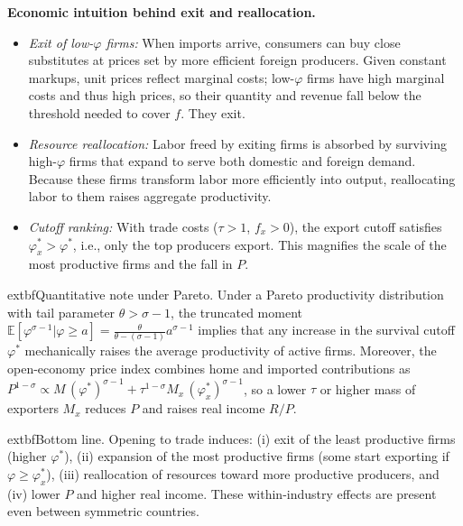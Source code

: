 \begin{solution}
\bigskip
	\textbf{Economic intuition behind exit and reallocation.}
\begin{itemize}
	\item \emph{Exit of low-$\varphi$ firms:} When imports arrive, consumers can buy close substitutes at prices set by more efficient foreign producers. Given constant markups, unit prices reflect marginal costs; low-$\varphi$ firms have high marginal costs and thus high prices, so their quantity and revenue fall below the threshold needed to cover $f$. They exit.
	\item \emph{Resource reallocation:} Labor freed by exiting firms is absorbed by surviving high-$\varphi$ firms that expand to serve both domestic and foreign demand. Because these firms transform labor more efficiently into output, reallocating labor to them raises aggregate productivity.
	\item \emph{Cutoff ranking:} With trade costs ($\tau>1$, $f_x>0$), the export cutoff satisfies $\varphi_x^*>\varphi^*$, i.e., only the top producers export. This magnifies the scale of the most productive firms and the fall in $P$.
\end{itemize}

\bigskip
		extbf{Quantitative note under Pareto.}
Under a Pareto productivity distribution with tail parameter $\theta>\sigma-1$, the truncated moment $\mathbb{E}[\varphi^{\sigma-1}|\varphi\ge a]=\tfrac{\theta}{\theta-(\sigma-1)}a^{\sigma-1}$ implies that any increase in the survival cutoff $\varphi^*$ mechanically raises the average productivity of active firms. Moreover, the open-economy price index combines home and imported contributions as $P^{1-\sigma}\propto M\, (\varphi^*)^{\sigma-1} + \tau^{1-\sigma} M_x\, (\varphi_x^*)^{\sigma-1}$, so a lower $\tau$ or higher mass of exporters $M_x$ reduces $P$ and raises real income $R/P$.

\bigskip
	extbf{Bottom line.}
Opening to trade induces: (i) exit of the least productive firms (higher $\varphi^*$), (ii) expansion of the most productive firms (some start exporting if $\varphi\ge\varphi_x^*$), (iii) reallocation of resources toward more productive producers, and (iv) lower $P$ and higher real income. These within-industry effects are present even between symmetric countries.

\medskip
\noindent{}
\end{solution}
